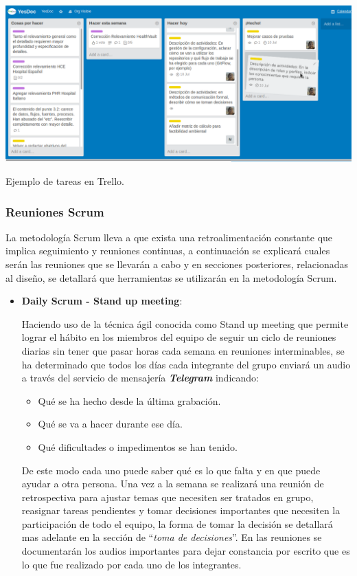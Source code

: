     \begin{correccionFigure}
      \centering
      \includegraphics[width=.8\textwidth]{img/tp2_definicion/trello_tareas}
      \caption{Ejemplo de tareas en Trello.}
      \label{trello_tareas}
    \end{correccionFigure}
{\correccionTexto
\subsubsection{Reuniones Scrum}
La metodología Scrum lleva a que exista una retroalimentación constante que implica seguimiento y reuniones continuas, a continuación se explicará cuales serán las reuniones que se llevarán a cabo y en secciones posteriores, relacionadas al diseño, se detallará que herramientas se utilizarán en la metodología Scrum.
\begin{itemize}
	\item \textbf{Daily Scrum - Stand up meeting}:
    
    
    Haciendo uso de la técnica ágil conocida como Stand up meeting que permite  lograr el hábito en los miembros del equipo de seguir un ciclo de reuniones diarias sin tener que pasar horas cada semana en reuniones interminables, se ha determinado que  todos los días cada integrante del grupo enviará un audio a través del servicio de mensajería \textbf{\textit{Telegram}} indicando:
    \begin{itemize}
        \item Qué se ha hecho desde la última grabación.
        \item Qué se va a hacer durante ese día.
        \item Qué dificultades o impedimentos se han tenido.
    \end{itemize}
    De este modo cada uno puede saber qué es lo que falta y en que puede ayudar a otra persona. Una vez a la semana se realizará una reunión de retrospectiva para ajustar temas que necesiten ser tratados en grupo, reasignar tareas pendientes y tomar decisiones importantes que necesiten la participación de todo el equipo, la forma de tomar la decisión se detallará mas adelante en la sección de ``\textit{toma de decisiones}''. En las reuniones se documentarán los audios importantes para dejar constancia por escrito que es lo que fue realizado por cada uno de los integrantes.
    

\end{itemize}}
